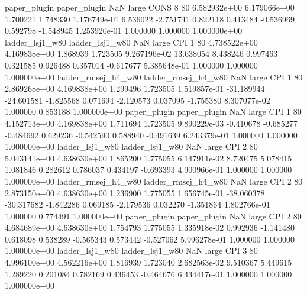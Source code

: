        paper_plugin        paper_plugin                   NaN      large     CONS                 8 80 6.582932e+00   6.179066e+00      1.700221       1.748330  1.176749e-01      6.536022     -2.751741     0.822118       0.413484 -0.536969   0.592798    -1.548945   1.253920e-01            1.000000        1.000000        1.000000e+00
    ladder_lsj1_w80     ladder_lsj1_w80                   NaN      large      CPI                 1 80 4.738522e+00   4.169838e+00      1.868939       1.723505  9.267196e-02     13.638054      8.438246     0.997463       0.321585  0.926488   0.357014    -0.617677   5.385648e-01            1.000000        1.000000        1.000000e+00
ladder_rmsej_h4_w80 ladder_rmsej_h4_w80                   NaN      large      CPI                 1 80 2.869268e+00   4.169838e+00      1.299496       1.723505  1.519857e-01    -31.189944    -24.601581    -1.825568       0.071694 -2.120573   0.037095    -1.755380   8.307077e-02            1.000000        0.853188        1.000000e+00
       paper_plugin        paper_plugin                   NaN      large      CPI                 1 80 4.152713e+00   4.169838e+00      1.711694       1.723505  9.890229e-03     -0.410678     -0.685277    -0.484692       0.629236 -0.542590   0.588940    -0.491639   6.243379e-01            1.000000        1.000000        1.000000e+00
    ladder_lsj1_w80     ladder_lsj1_w80                   NaN      large      CPI                 2 80 5.043141e+00   4.638630e+00      1.865200       1.775055  6.147911e-02      8.720475      5.078415     1.081846       0.282612  0.786037   0.434197    -0.693393   4.900966e-01            1.000000        1.000000        1.000000e+00
ladder_rmsej_h4_w80 ladder_rmsej_h4_w80                   NaN      large      CPI                 2 80 2.873150e+00   4.638630e+00      1.236900       1.775055  1.656745e-01    -38.060378    -30.317682    -1.842286       0.069185 -2.179536   0.032270    -1.351864   1.802766e-01            1.000000        0.774491        1.000000e+00
       paper_plugin        paper_plugin                   NaN      large      CPI                 2 80 4.684689e+00   4.638630e+00      1.754793       1.775055  1.335918e-02      0.992936     -1.141480     0.618098       0.538289 -0.565343   0.573442    -0.527062   5.996278e-01            1.000000        1.000000        1.000000e+00
    ladder_lsj1_w80     ladder_lsj1_w80                   NaN      large      CPI                 3 80 4.996100e+00   4.562216e+00      1.816939       1.723040  2.682563e-02      9.510367      5.449615     1.289220       0.201084  0.782169   0.436453    -0.464676   6.434417e-01            1.000000        1.000000        1.000000e+00
